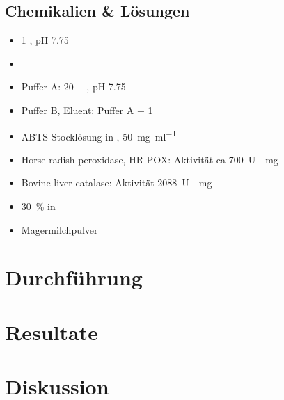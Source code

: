 \documentclass[a4paper,german]{scrreprt}
\begin{document}
\section{Chemikalien \& Lösungen}

\begin{itemize}
	\item  \SI{1}{\Molar} , pH 7.75
	\item {}
	\item Puffer A: \SI{20}{\milli\Molar} , pH 7.75
	\item Puffer B, Eluent: Puffer A + \SI{1}{\Molar} 
	\item ABTS-Stocklösung in , \SI{50}{\milli\gram \per \milli\litre}
	\item Horse radish peroxidase, HR-POX: Aktivität ca \SI{700}{U \per \milli\gram}
	\item Bovine liver catalase: Aktivität \SI{2088}{U \per \milli\gram}
	\item {} \SI{30}{\percent} in 
	\item Magermilchpulver
\end{itemize}

\chapter{Durchführung}

\chapter{Resultate}

\chapter{Diskussion}



\end{document}
